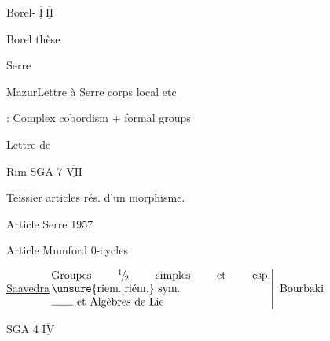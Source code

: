 \uline{}\qquad Borel- $\overline{\underline{\mathrm I}}\ \overline{\underline{\mathrm {II}}}$

Borel thèse

Serre 

Mazur\qquad Lettre à Serre corps  local etc


 : Complex cobordism $+$ formal groups

Lettre de 

Rim SGA 7 $\overline{\underline{\mathrm{VII}}}$

Teissier articles  rés. d'un morphisme.

\qquad Article Serre 1957

\qquad Article Mumford $0$-cycles

\uline{Saavedra}\qquad \(\left.\begin{array}{@{}p{.58\linewidth}@{}}Groupes ${}^{1}\!/\!{}_{2}$ simples et esp. \unsure{riem.|riém.} sym.\\\rule{2em}{.35pt} et Algèbres de Lie\end{array}\right\vert\ \text{Bourbaki}\)

SGA 4 $\overline{\underline{\mathrm{IV}}}$


